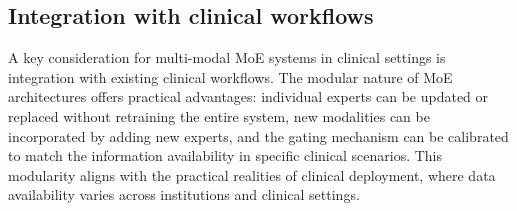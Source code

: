 \subsection*{Integration with clinical workflows}

A key consideration for multi-modal MoE systems in clinical settings is integration with existing clinical workflows. The modular nature of MoE architectures offers practical advantages: individual experts can be updated or replaced without retraining the entire system, new modalities can be incorporated by adding new experts, and the gating mechanism can be calibrated to match the information availability in specific clinical scenarios. This modularity aligns with the practical realities of clinical deployment, where data availability varies across institutions and clinical settings.
